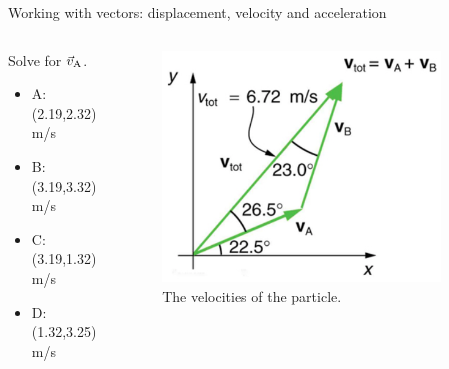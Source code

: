\documentclass{beamer}
\begin{document}
\begin{frame}{Working with vectors: displacement, velocity and acceleration}
\begin{columns}[T]
\begin{column}{0.5\textwidth}
\small Solve for $\vec{v}_{\rm A}$.
\begin{itemize}
\item A: (2.19,2.32) m/s
\item B: (3.19,3.32) m/s
\item C: (3.19,1.32) m/s
\item D: (1.32,3.25) m/s
\end{itemize}
\end{column}
\begin{column}{0.5\textwidth}
\begin{figure}
\centering
\includegraphics[width=0.9\textwidth]{figures/vecdiag2.png}
\caption{\label{fig:vecdiag3} The velocities of the particle.}
\end{figure}
\end{column}
\end{columns}
\end{frame}
\end{document}
